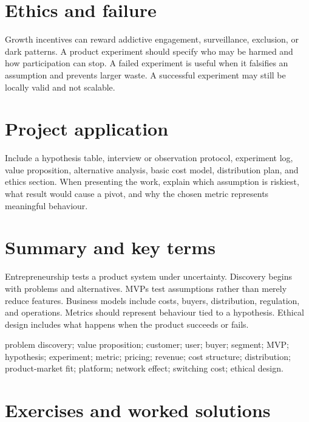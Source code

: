 \section{Ethics and failure}
Growth incentives can reward addictive engagement, surveillance, exclusion, or dark patterns. A product experiment should specify who may be harmed and how participation can stop. A failed experiment is useful when it falsifies an assumption and prevents larger waste. A successful experiment may still be locally valid and not scalable.

\section{Project application}
Include a hypothesis table, interview or observation protocol, experiment log, value proposition, alternative analysis, basic cost model, distribution plan, and ethics section. When presenting the work, explain which assumption is riskiest, what result would cause a pivot, and why the chosen metric represents meaningful behaviour.

\section{Summary and key terms}
Entrepreneurship tests a product system under uncertainty. Discovery begins with problems and alternatives. MVPs test assumptions rather than merely reduce features. Business models include costs, buyers, distribution, regulation, and operations. Metrics should represent behaviour tied to a hypothesis. Ethical design includes what happens when the product succeeds or fails.

\begin{keyterms}problem discovery; value proposition; customer; user; buyer; segment; MVP; hypothesis; experiment; metric; pricing; revenue; cost structure; distribution; product-market fit; platform; network effect; switching cost; ethical design.\end{keyterms}

\section{Exercises and worked solutions}

